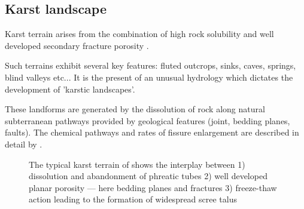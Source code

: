  \subsection{Karst landscape}
Karst terrain arises from the combination of high rock solubility and well developed secondary fracture porosity \citep{ford2013karst}. 

Such terrains exhibit several key features: fluted outcrops, sinks, caves, springs, blind valleys etc... It is the present of an unusual hydrology which dictates the development of 'karstic landscapes'. 

These landforms are generated by the dissolution of rock along natural subterranean pathways provided by geological features (joint, bedding planes, faults). The chemical pathways and rates of fissure enlargement are described in detail by \citet{dreybrodt1996principles}.

\begin{figure}[t!]
\checkoddpage \ifoddpage \forcerectofloat \else \forceversofloat \fi
{}
\caption{The typical karst terrain of  shows the interplay between 1) dissolution and abandonment of phreatic tubes 2) well developed planar porosity --- here bedding planes and fractures 3) freeze-thaw action leading to the formation of widespread scree talus }
\label{fig:shaft}
\end{figure}

